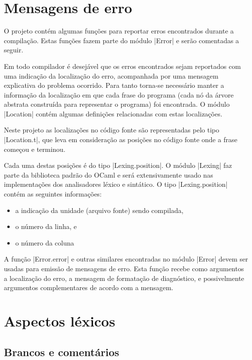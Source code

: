 \documentclass[a4paper,11pt,brazil]{article}
\begin{document}
\section{Mensagens de erro}

O projeto contém algumas funções para reportar erros encontrados
durante a compilação. Estas funções fazem parte do módulo
\pyginline|Error| e serão comentadas a seguir.

Em todo compilador é desejável que os erros encontrados sejam
reportados com uma indicação da localização do erro, acompanhada por
uma mensagem explicativa do problema ocorrido. Para tanto torna-se
necessário manter a informação da localização em que cada frase do
programa (cada nó da árvore abstrata construída para representar o
programa) foi encontrada. O módulo \pyginline|Location| contém algumas
definições relacionadas com estas localizações.

Neste projeto as localizações no código fonte são representadas pelo
tipo \pyginline|Location.t|, que leva em consideração as posições no
código fonte onde a frase começou e terminou.

Cada uma destas posições é do tipo \pyginline|Lexing.position|. O
módulo \pyginline|Lexing| faz parte da biblioteca padrão do OCaml e
será extensivamente usado nas implementações dos analisadores léxico e
sintático. O tipo \pyginline|Lexing.position| contém as seguintes
informações:
\begin{itemize}
  \item a indicação da unidade (arquivo fonte) sendo compilada,
  \item o número da linha, e
  \item o número da coluna
\end{itemize}

A função \pyginline|Error.error| e outras similares encontradas no
módulo \pyginline|Error| devem ser usadas para emissão de mensagens de
erro. Esta função recebe como argumentos a localização do erro, a
mensagem de formatação de diagnóstico, e possivelmente argumentos
complementares de acordo com a mensagem.


\section{Aspectos léxicos}
\label{sec:lex}

\subsection{Brancos e comentários}
\end{document}
